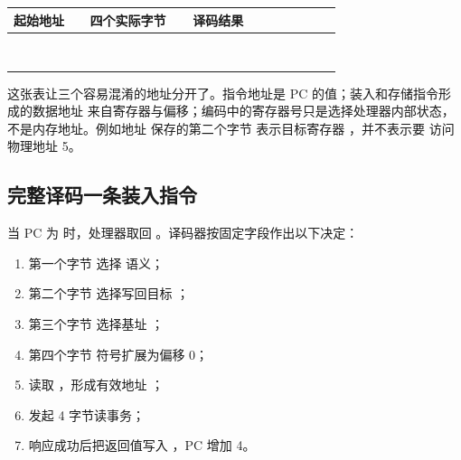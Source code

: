 \begin{longtable}{|L{0.20\linewidth}|L{0.27\linewidth}|L{0.39\linewidth}|}
\hline
{}
起始地址 & 四个实际字节 & 译码结果 \\ \hline
{} &  &  \\ \hline
{} &  &  \\ \hline
{} &  &  \\ \hline
{} &  &  \\ \hline
{} &  &  \\ \hline
{} &  &  \\ \hline
{} &  &  \\ \hline
{} &  &  \\ \hline
\end{longtable}

这张表让三个容易混淆的地址分开了。指令地址是 PC 的值；装入和存储指令形成的数据地址
来自寄存器与偏移；编码中的寄存器号只是选择处理器内部状态，不是内存地址。例如地址
 保存的第二个字节  表示目标寄存器 ，并不表示要
访问物理地址 5。

\subsection{完整译码一条装入指令}

当 PC 为  时，处理器取回
。译码器按固定字段作出以下决定：

\begin{enumerate}
\item 第一个字节  选择  语义；
\item 第二个字节  选择写回目标 ；
\item 第三个字节  选择基址 ；
\item 第四个字节  符号扩展为偏移 0；
\item 读取 ，形成有效地址 ；
\item 发起 4 字节读事务；
\item 响应成功后把返回值写入 ，PC 增加 4。
\end{enumerate}

